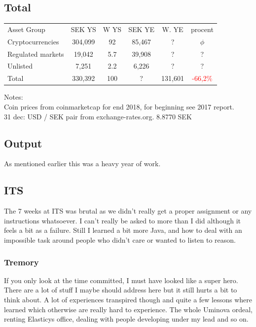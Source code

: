 \documentclass[a4paper]{article}
\begin{document}
\subsection{Total}
\begin{tabular}{l|c|c|c|c|c}
	Asset Group & SEK YS & W YS & SEK YE & W. YE & procent \\
    Cryptocurrencies  & 304,099 & 92  & 85,467 & ? & $ \phi $ \\
    Regulated markets & 19,042  & 5.7 & 39,908  & ? & ? \\
    Unlisted          & 7,251   & 2.2 & 6,226   & ? & ? \\
    Total & 330,392   & 100     & ?   & 131,601 & \textcolor{red}{-66,2\%} \\
\end{tabular}

Notes: \\
Coin prices from coinmarketcap for end 2018, for beginning see 2017 report. \\


31 dec: USD / SEK pair from exchange-rates.org. 8.8770 SEK \\

\subsection{Output}

As mentioned earlier this was a heavy year of work.

\subsection{ITS}

The 7 weeks at ITS was brutal as we didn't really get a proper assignment or any instructions whatsoever.
I can't really be asked to more than I did although it feels a bit as a failure. Still I learned a bit more
Java, and how to deal with an impossible task around people who didn't care or wanted to listen to reason.

\subsubsection{Tremory}

If you only look at the time committed, I must have looked like a super hero. There are a lot of stuff I maybe should address here but
it still hurts a bit to think about. A lot of experiences transpired though and quite a few lessons where learned which otherwise are really hard to experience. The whole Uminova ordeal, renting Elasticys office, dealing with people developing under my lead and so on. 
\end{document}
